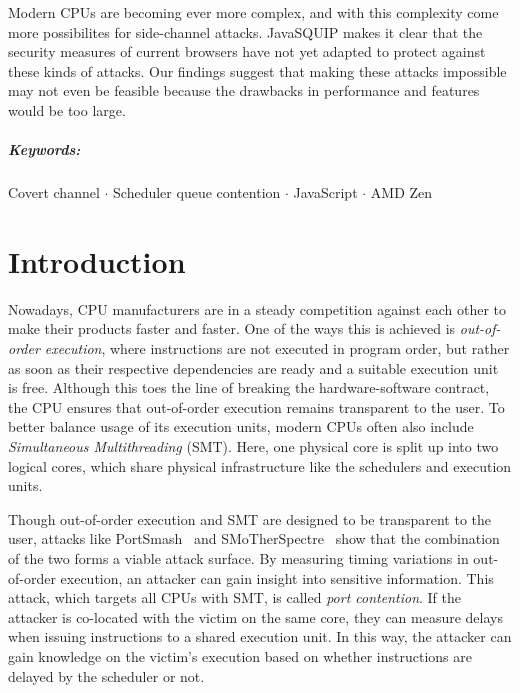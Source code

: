 \documentclass[11pt,
  titlepage=false,
]{scrreprt}
\begin{document}
Modern CPUs are becoming ever more complex, and with this complexity come more possibilites for side-channel attacks.
JavaSQUIP makes it clear that the security measures of current browsers have not yet adapted to protect against these kinds of attacks.
Our findings suggest that making these attacks impossible may not even be feasible because the drawbacks in performance and features would be too large.
\paragraph{Keywords:}
Covert channel $\cdot$
Scheduler queue contention $\cdot$
JavaScript $\cdot$
AMD Zen

\clearpage


\chapter{Introduction}
\label{ch:introduction}

Nowadays, CPU manufacturers are in a steady competition against each other to make their products faster and faster.
One of the ways this is achieved is \textit{out-of-order execution}, where instructions are not executed in program order,
but rather as soon as their respective dependencies are ready and a suitable execution unit is free.
Although this toes the line of breaking the hardware-software contract, the CPU ensures that out-of-order execution remains transparent to the user.
To better balance usage of its execution units, modern CPUs often also include \textit{Simultaneous Multithreading} (SMT).
Here, one physical core is split up into two logical cores, which share physical infrastructure like the schedulers and execution units.

Though out-of-order execution and SMT are designed to be transparent to the user, attacks like
PortSmash~\cite{Aldaya2019port} and SMoTherSpectre~\cite{Bhattacharyya2019} show that the combination of the two forms a viable attack surface.
By measuring timing variations in out-of-order execution, an attacker can gain insight into sensitive information.
This attack, which targets all CPUs with SMT, is called \textit{port contention}.
If the attacker is co-located with the victim on the same core, they can measure delays when issuing instructions to a shared execution unit.
In this way, the attacker can gain knowledge on the victim's execution based on whether instructions are delayed by the scheduler or not.
\end{document}
